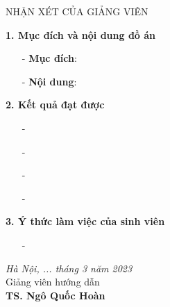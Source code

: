 \newpage
\thispagestyle{empty}
\begin{center}
    NHẬN XÉT CỦA GIẢNG VIÊN
\end{center}
\textbf{1. Mục đích và nội dung đồ án}
\begin{itemize}
    \item[-] \textbf{Mục đích}: 
    \vspace{2cm}
    \item[-] \textbf{Nội dung}: 
    \vspace{2cm}

\end{itemize}
\textbf{2. Kết quả đạt được}
\begin{itemize}
    \item[-] 
    \item[-] 
    \item[-] 
    \item[-] 
    
\end{itemize}
\textbf{3. Ý thức làm việc của sinh viên}
\begin{itemize}
    \item[-] 
\end{itemize}
\vspace{3cm}
\vspace{.5cm}
\hspace{0.5\textwidth}
\begin{minipage}{0.5\textwidth}
	\noindent\begin{center}
		\textit{Hà Nội, ... tháng 3 năm 2023} \\
		Giảng viên hướng dẫn\\ \vspace{2cm}
		\textbf{TS. Ngô Quốc Hoàn} \\
	\end{center}	
\end{minipage}
